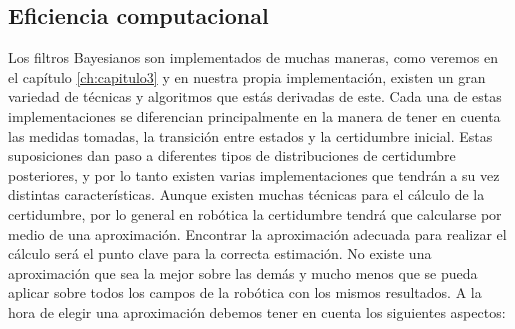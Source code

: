 \subsection{Eficiencia computacional}

Los filtros Bayesianos son implementados de muchas maneras, como veremos en el capítulo \ref{ch:capitulo3} y en nuestra propia implementación, existen un gran variedad de técnicas y algoritmos que estás derivadas de este.
%
%
%
%
%
%
%
%
%
Cada una de estas implementaciones se diferencian principalmente en la manera de tener en cuenta las medidas tomadas, la transición entre estados y la certidumbre inicial.
Estas suposiciones dan paso a diferentes tipos de distribuciones de certidumbre posteriores, y por lo tanto existen varias implementaciones que tendrán a su vez distintas características.
%
%
%
Aunque existen muchas técnicas para el cálculo de la certidumbre, por lo general en robótica la certidumbre tendrá que calcularse por medio de una aproximación.
Encontrar la aproximación adecuada para realizar el cálculo será el punto clave para la correcta estimación.
No existe una aproximación que sea la mejor sobre las demás y mucho menos que se pueda aplicar sobre todos los campos de la robótica con los mismos resultados.
A la hora de elegir una aproximación debemos tener en cuenta los siguientes aspectos:

